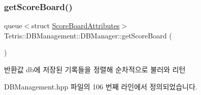 \subsubsection{\texorpdfstring{get\+Score\+Board()}{getScoreBoard()}}
{\footnotesize\ttfamily queue$<$struct \hyperlink{struct_tetris_1_1_d_b_management_1_1_score_board_attributes}{Score\+Board\+Attributes}$>$ Tetris\+::\+D\+B\+Management\+::\+D\+B\+Manager\+::get\+Score\+Board (\begin{DoxyParamCaption}{ }\end{DoxyParamCaption})\hspace{0.3cm}{\ttfamily [inline]}}

\begin{DoxyReturn}{반환값}
db에 저장된 기록들을 정렬해 순차적으로 불러와 리턴 
\end{DoxyReturn}


D\+B\+Management.\+hpp 파일의 106 번째 라인에서 정의되었습니다.


